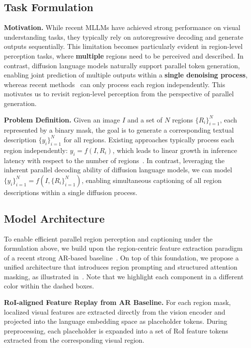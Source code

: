 \documentclass{llmxive}
\begin{document}
\vspace{-2mm}
\subsection{Task Formulation}
\noindent
\textbf{Motivation.}
While recent MLLMs have achieved strong performance on visual understanding tasks, they typically rely on autoregressive decoding and generate outputs sequentially. 
%
This limitation becomes particularly evident in region-level perception tasks, where \textbf{multiple} regions need to be perceived and described.
%
In contrast, diffusion language models naturally support parallel token generation, enabling joint prediction of multiple outputs within a \textbf{single denoising process}, whereas recent methods~\citep{lian2025describe, wang2025grasp} can only process each region independently. 
%
This motivates us to revisit region-level perception from the perspective of parallel generation.

\noindent
\textbf{Problem Definition.}
Given an image $I$ and a set of $N$ regions $\{ R_i \}_{i=1}^N$, each represented by a binary mask, the goal is to generate a corresponding textual description $\{ y_i \}_{i=1}^N$ for all regions. 
%
Existing approaches typically process each region independently: $y_i = f(I,R_i)$, which leads to linear growth in inference latency with respect to the number of regions~\citep{rasheed2024glamm,lian2025describe}. 
%
In contrast, leveraging the inherent parallel decoding ability of diffusion language models, we can model $\{ y_i \}_{i=1}^N = f(I, \{ R_i \}_{i=1}^N)$, enabling simultaneous captioning of all region descriptions within a single diffusion process.


\vspace{-2mm}
\subsection{Model Architecture}
To enable efficient parallel region perception and captioning under the formulation above, we build upon the region-centric feature extraction paradigm of a recent strong AR-based baseline~\citep{wang2025grasp}. On top of this foundation, we propose a unified architecture that introduces region prompting and structured attention masking, as illustrated in~.
Note that we highlight each component in a different color within the dashed boxes.

\noindent
\textbf{RoI-aligned Feature Replay from AR Baseline.} 
%
For each region mask, localized visual features are extracted directly from the vision encoder and projected into the language embedding space as placeholder tokens. During preprocessing, each placeholder is expanded into a set of RoI feature tokens extracted from the corresponding visual region.
\end{document}
